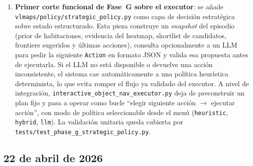 \documentclass[11pt,a4paper]{article}
\begin{document}
\begin{enumerate}
  \item \textbf{Primer corte funcional de Fase~G sobre el executor}: se añade
        \texttt{vlmaps/policy/strategic\_policy.py} como capa de decisión
        estratégica sobre estado estructurado. Esta pieza construye un
        \emph{snapshot} del episodio (prior de habitaciones, evidencia del
        heatmap, shortlist de candidatos, frontiers sugeridos y últimas
        acciones), consulta opcionalmente a un LLM para pedir la siguiente
        \texttt{Action} en formato JSON y valida esa propuesta antes de
        ejecutarla. Si el LLM no está disponible o devuelve una acción
        inconsistente, el sistema cae automáticamente a una política
        heurística determinista, lo que evita romper el flujo ya validado del
        executor. A nivel de integración, \texttt{interactive\_object\_nav\_executor.py}
        deja de preconstruir un plan fijo y pasa a operar como bucle
        ``elegir siguiente acción $\rightarrow$ ejecutar acción'', con modo de
        política seleccionable desde el menú (\texttt{heuristic},
        \texttt{hybrid}, \texttt{llm}). La validación unitaria queda cubierta
        por \texttt{tests/test\_phase\_g\_strategic\_policy.py}.

\end{enumerate}

\subsection*{22 de abril de 2026}
\end{document}
